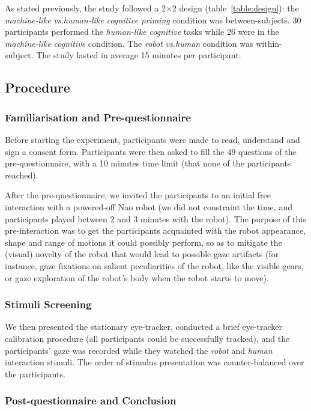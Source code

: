 \documentclass[lettersize, noapacite, twoside, HRI]{apa_HRI}
\newcommand{\vs}{\textit{vs.}\xspace}
\begin{document}
As stated previously, the study followed a 2$\times$2 design
(table~\ref{table:design}): the \emph{machine-like} \vs \emph{human-like
cognitive priming} condition was between-subjects. 30 participants performed the
\emph{human-like cognitive} tasks while 26 were in the \emph{machine-like
cognitive} condition. The \emph{robot} \vs \emph{human} condition was
within-subject. The study lasted in average 15 minutes per participant.

\subsection{Procedure}

\subsubsection{Familiarisation and Pre-questionnaire}

Before starting the experiment, participants were made to read, understand and sign a
consent form. Participants were then asked to fill the 49 questions of
the pre-questionnaire, with a 10 minutes time limit (that none of the participants
reached).

After the pre-questionnaire, we invited the participants to an initial
free interaction with a powered-off Nao robot (we did not constraint
the time, and participants played between 2 and 3 minutes with the robot).
The purpose of this pre-interaction was to get the participants acquainted with the
robot appearance, shape and range of motions it could possibly perform, so as to
mitigate the (visual) novelty of the robot that would lead to possible
gaze artifacts (for instance, gaze fixations on salient peculiarities of the
robot, like the visible gears, or gaze exploration of the robot's body when the robot
starts to move).

\subsubsection{Stimuli Screening}

We then presented the stationary eye-tracker, conducted a brief eye-tracker
calibration procedure (all participants could be successfully tracked), and the
participants' gaze was recorded while they watched the \emph{robot} and
\emph{human} interaction stimuli. The order of stimulus presentation
was counter-balanced over the participants.

\subsubsection{Post-questionnaire and Conclusion}
\end{document}

